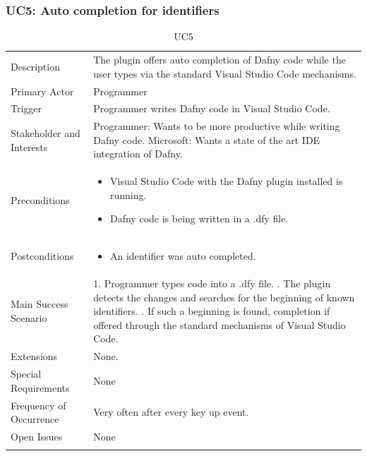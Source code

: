 \subsubsection{UC5: Auto completion for identifiers}
\begin{longtable}{l | p{} }
	Description & The plugin offers auto completion of Dafny code while the user types via the standard Visual Studio Code mechanisms.\\ 
	Primary Actor & Programmer\\ 
	Trigger & Programmer writes Dafny code in Visual Studio Code.\\ 
	Stakeholder and Interests & Programmer: Wants to be more productive while writing Dafny code. \newline Microsoft: Wants a state of the art IDE integration of Dafny.\\ 
	Preconditions &
	\begin{itemize}
		\item Visual Studio Code with the Dafny plugin installed is running.
		\item Dafny code is being written in a .dfy file.
	\end{itemize}\\ 
	Postconditions &
	\begin{itemize}
		\item An identifier was auto completed.
	\end{itemize}\\ 
	Main Success Scenario & 
	1. Programmer types code into a .dfy file. \newline
	2. The plugin detects the changes and searches for the beginning of known identifiers. \newline
	3. If such a beginning is found, completion if offered through the standard mechanisms of Visual Studio Code.\\ 
	Extensions & 
	None. \\ 
	Special Requirements & None\\ 
	Frequency of Occurrence & Very often after every key up event.\\ 
	Open Issues & None \\ 
	\caption{UC5}
\end{longtable}